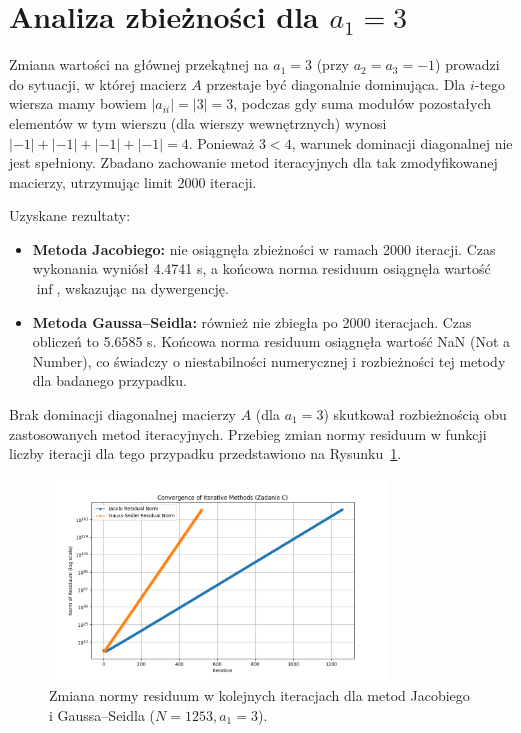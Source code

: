 \documentclass[a4paper, 11pt]{article}
\begin{document}
\section{Analiza zbieżności dla $a_1 = 3$}
Zmiana wartości na głównej przekątnej na $a_1=3$ (przy $a_2=a_3=-1$) prowadzi do sytuacji, w której macierz $A$ przestaje być diagonalnie dominująca. Dla $i$-tego wiersza mamy bowiem $|a_{ii}| = |3| = 3$, podczas gdy suma modułów pozostałych elementów w tym wierszu (dla wierszy wewnętrznych) wynosi $|-1|+|-1|+|-1|+|-1| = 4$. Ponieważ $3 < 4$, warunek dominacji diagonalnej nie jest spełniony. Zbadano zachowanie metod iteracyjnych dla tak zmodyfikowanej macierzy, utrzymując limit 2000 iteracji.

Uzyskane rezultaty:
\begin{itemize}
    \item \textbf{Metoda Jacobiego:} nie osiągnęła zbieżności w ramach 2000 iteracji. Czas wykonania wyniósł \num{4.4741} s, a końcowa norma residuum osiągnęła wartość $\inf$, wskazując na dywergencję.
    \item \textbf{Metoda Gaussa–Seidla:} również nie zbiegła po 2000 iteracjach. Czas obliczeń to \num{5.6585} s. Końcowa norma residuum osiągnęła wartość NaN (Not a Number), co świadczy o niestabilności numerycznej i rozbieżności tej metody dla badanego przypadku.
\end{itemize}
Brak dominacji diagonalnej macierzy $A$ (dla $a_1=3$) skutkował rozbieżnością obu zastosowanych metod iteracyjnych. Przebieg zmian normy residuum w funkcji liczby iteracji dla tego przypadku przedstawiono na Rysunku~\ref{fig:task_c_convergence}.

\begin{figure}[H]
    \centering
    \includegraphics[width=0.8\textwidth]{residuals_plot_C}
    \caption{Zmiana normy residuum w kolejnych iteracjach dla metod Jacobiego i Gaussa–Seidla ($N=1253, a_1=3$).}
    \label{fig:task_c_convergence}
\end{figure}
\end{document}
